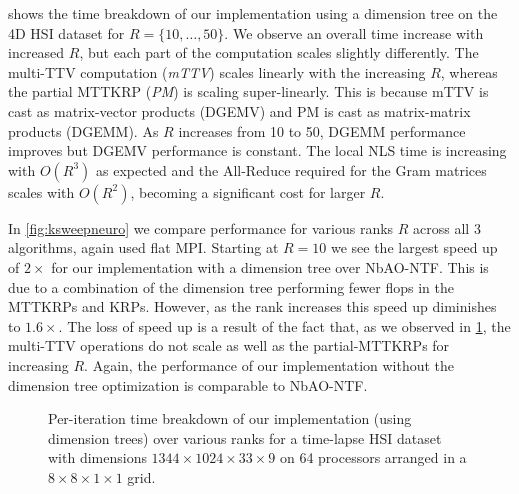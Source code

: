  shows the time breakdown of our implementation using a dimension tree on the 4D HSI dataset for $R=\{10,\dots,50\}$. 
We observe an overall time increase with increased $R$, but each part of the computation scales slightly differently.
The multi-TTV computation ({\em mTTV}) scales linearly with the increasing $R$,  whereas the partial MTTKRP ({\em PM}) is scaling super-linearly. 
This is because mTTV is cast as matrix-vector products (DGEMV) and PM is cast as matrix-matrix products (DGEMM).
As $R$ increases from 10 to 50, DGEMM performance improves but DGEMV performance is constant.  
The local NLS time is increasing with $O(R^3)$ as expected and the All-Reduce required for the Gram matrices scales with $O(R^2)$, becoming a significant cost for larger $R$. 

In \cref{fig:ksweepneuro} we compare performance for various ranks $R$ across all 3 algorithms, again used flat MPI. 
Starting at $R=10$ we see the largest speed up of $2\times$ for our implementation with a dimension tree over NbAO-NTF. 
This is due to a combination of the dimension tree performing fewer flops in the MTTKRPs and KRPs. 
However, as the rank increases this speed up diminishes to $1.6\times$. 
The loss of speed up is a result of the fact that, as we observed in \cref{fig:ksweep4DHSI}, the multi-TTV operations do not scale as well as the partial-MTTKRPs for increasing $R$.
Again, the performance of our implementation without the dimension tree optimization is comparable to NbAO-NTF. 

\begin{figure}
\renewcommand{\datafile}{data/ksw_4D_HSI.dat}
\renewcommand{\numiterations}{10}
\caption{Per-iteration time breakdown of our implementation (using dimension trees) over various ranks for a time-lapse HSI dataset with dimensions $1344\times 1024\times 33 \times 9$ on 64 processors arranged in a $8\times8\times1\times1$ grid.}
\label{fig:ksweep4DHSI}
\end{figure}

